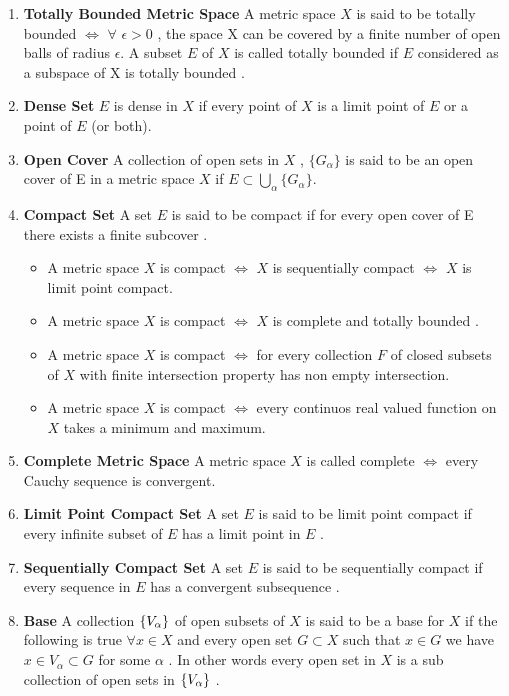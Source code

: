\begin{enumerate}
	\item  \textbf{Totally Bounded Metric Space} A metric space $X$ is said to be totally bounded 
	$\iff$ $\forall $ $\epsilon >0$ , the space X can  be covered by a finite number of open balls of radius $\epsilon$. A subset $E$ of $X$ is called totally bounded if $E$ considered as a subspace of X is totally bounded .  
	
	\item \textbf{Dense Set} $E$ is dense in $X$ if every point of $X$ is a limit  point of $E$ or a point of $E$ (or both).
	
	\item \textbf{Open Cover} A collection of open sets in $X$ , $\{G_{\alpha}\}$ is said to be an open cover of E in  a metric space $X$ if $E\subset\bigcup_{\alpha}\{G_{\alpha}\}$. 
	\item \textbf {Compact Set} A set $E$ is said to be compact if for every open cover of E there exists a finite subcover .
	\begin{itemize}
		\item A metric space $X$ is compact $\iff$ $X$ is sequentially compact $\iff$ $X$ is limit point compact. 
		\item A metric space $X$ is compact $\iff$ $X$ is complete and totally bounded .
		\item A metric space $X$ is compact $\iff$ for every collection $F$ of closed subsets of  $X$ with finite intersection property has non empty intersection.
		\item  A metric space $X$ is compact $\iff$
		every continuos real valued function on $X$
		takes a minimum and maximum.
	\end{itemize} 
	\item  \textbf {Complete Metric Space } A metric space $X$ is called complete  $\iff$ every Cauchy sequence is convergent.
	\item \textbf{Limit Point Compact Set } A set $E$ is said to be  limit point compact if every infinite subset of $E$ has a limit point in $E$ .
	\item  \textbf{Sequentially Compact Set}   A set $E$ is said to be sequentially compact if  every sequence in $E$ has a convergent subsequence . 
	\item  \textbf{Base} A collection $\left\{V_{\alpha}\right\}$ of open subsets of $X$ is said to be a base for $X$ if the following is true $\forall x  \in X$ and every open set $G\subset X $ such that $x\in G$ we have $x\in V_{\alpha}\subset G$ for some $\alpha$ . In other words every open set in $X$ is a sub collection of open sets in $\left\{V_{\alpha}\right\}$ .

\end{enumerate}
